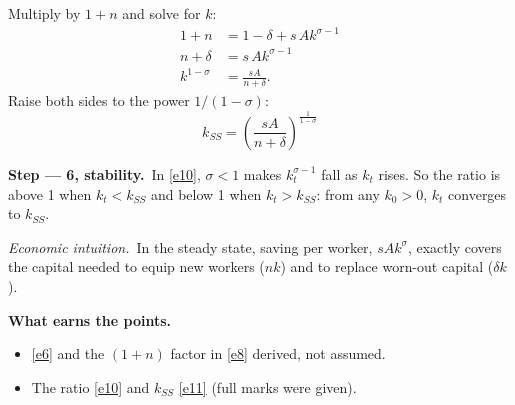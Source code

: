 \documentclass[11pt,a4paper]{article}
\newcommand{\passo}[1]{\par\smallskip\noindent\textbf{Step --- #1.}~}
\newcommand{\intuicao}[1]{\par\smallskip\noindent\textit{Economic intuition.}~#1}
\newcommand{\rubrica}[1]{\par\smallskip\noindent\textbf{What earns the points.}\begin{itemize}[leftmargin=1.4em,topsep=1pt]#1\end{itemize}}
\begin{document}
Multiply by $1+n$ and solve for $k$:
\begin{align*}
1+n &= 1-\delta+s\,A k^{\sigma-1}\\
n+\delta &= s\,A k^{\sigma-1}\\
k^{1-\sigma} &= \frac{sA}{n+\delta}.
\end{align*}
Raise both sides to the power $1/(1-\sigma)$:
\begin{equation}
\boxed{k_{SS}=\left(\frac{sA}{n+\delta}\right)^{\frac{1}{1-\sigma}}} \label{e11}
\end{equation}
\passo{6, stability}In \eqref{e10}, $\sigma<1$ makes $k_t^{\sigma-1}$ fall as $k_t$ rises. So the
ratio is above 1 when $k_t<k_{SS}$ and below 1 when $k_t>k_{SS}$: from any $k_0>0$, $k_t$ converges
to $k_{SS}$.
\intuicao{In the steady state, saving per worker, $sAk^{\sigma}$, exactly covers the capital needed
to equip new workers ($nk$) and to replace worn-out capital ($\delta k$).}
\rubrica{\item \eqref{e6} and the $(1+n)$ factor in \eqref{e8} derived, not assumed. \item The
ratio \eqref{e10} and $k_{SS}$ \eqref{e11} (full marks were given).}
\end{document}
